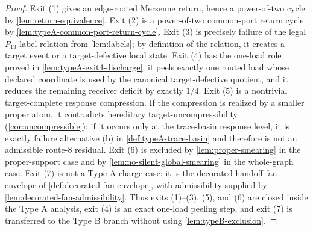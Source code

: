 \documentclass[11pt]{article}
\begin{document}
\begin{proof}
Exit (1) gives an edge-rooted Mersenne return, hence a power-of-two cycle by
\cref{lem:return-equivalence}.  Exit (2) is a power-of-two common-port return
cycle by \cref{lem:typeA-common-port-return-cycle}.  Exit (3) is precisely failure of the legal $P_{13}$ label
relation from \cref{lem:labels}; by definition of the relation, it creates a
target event or a target-defective local state.  Exit (4) has the one-load role
proved in \cref{lem:typeA-exit4-discharge}: it peels exactly one routed load
whose declared coordinate is used by the canonical target-defective quotient,
and it reduces the remaining receiver deficit by exactly \(1/4\).
Exit (5) is a nontrivial target-complete response compression.  If the
compression is realized by a smaller proper atom, it contradicts hereditary
target-uncompressibility (\cref{cor:uncompressible}); if it occurs only at the
trace-basin response level, it is exactly failure alternative (b) in
\cref{def:typeA-trace-basin} and therefore is not an admissible route-8
residual.  Exit (6) is excluded by
\cref{lem:proper-smearing} in the proper-support case and by
\cref{lem:no-silent-global-smearing} in the whole-graph case.  Exit (7) is not
a Type A charge case: it is the decorated handoff fan envelope of
\cref{def:decorated-fan-envelope}, with admissibility supplied by
\cref{lem:decorated-fan-admissibility}.  Thus exits (1)--(3), (5), and (6) are
closed inside the Type A analysis, exit (4) is an exact one-load peeling step,
and exit (7) is transferred to the Type B branch without using
\cref{lem:typeB-exclusion}.
\end{proof}
\end{document}
